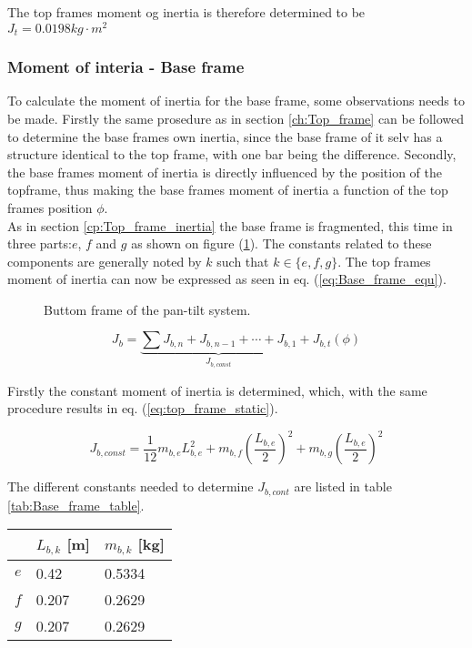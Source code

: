 \documentclass[../../main]{subfiles}
\begin{document}
The top frames moment og inertia is therefore determined to be
\newline $J_{t} = 0.0198 \si{kg\cdot m^2}$

\subsubsection{Moment of interia - Base frame}

To calculate the moment of inertia for the base frame, some observations needs to be made. Firstly the same prosedure as in section \ref{ch:Top_frame} can be followed to determine the base frames own inertia, since the base frame of it selv has a structure identical to the top frame, with one bar being the difference. Secondly, the base frames moment of inertia is directly influenced by the position of the topframe, thus making the base frames moment of inertia a function of the top frames position $\phi$.\\
As in section \ref{cp:Top_frame_inertia} the base frame is fragmented, this time in three parts:$e$, $f$ and $g$ as shown on figure (\ref{fig:ButtomFrame}). The constants related to these components are generally noted by $k$ such that $k \in \{e,f,g\}$. The top frames moment of inertia can now be expressed as seen in eq. (\ref{eq:Base_frame_equ}).

\begin{figure}[h]
  \label{fig:ButtomFrame}
  \centering
  
  \caption{Buttom frame of the pan-tilt system.}
\end{figure}

\begin{equation}
  \label{eq:Base_frame_equ}
  J_b =
  \underbrace{
  \sum J_{b,n} + J_{b,n-1} + \dotsb + J_{b,1}}_\text{$J_{b,const}$} + J_{b,t}(\phi)
\end{equation}

Firstly the constant moment of inertia is determined, which, with the same procedure results in eq. (\ref{eq:top_frame_static}).

\begin{equation}
  J_{b,const} = \frac{1}{12}m_{b,e}L_{b,e}^2 + m_{b,f} \left( \frac{L_{b,e}}{2} \right)^2 + m_{b,g}\left(\frac{L_{b,e}}{2}\right)^2
\end{equation}

The different constants needed to determine $J_{b,cont}$ are listed in table \ref{tab:Base_frame_table}.

\begin{table}[H]
\centering
\begin{tabular}{|l|l|l|}
\hline
  & $L_{b,k}$ [m]  & $m_{b,k}$ [kg]  \\
\hline
$e$ & 0.42  & 0.5334  \\
\hline
$f$ & 0.207  & 0.2629  \\
\hline
$g$ & 0.207 & 0.2629  \\
\hline
\end{tabular}
    \label{tab:mass_table}
\end{table}
\end{document}
